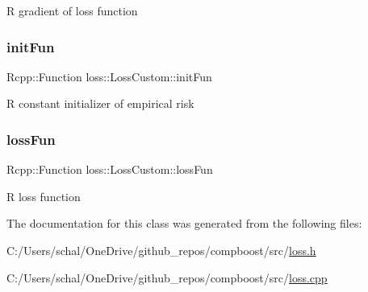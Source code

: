 {\ttfamily R} gradient of loss function 

\mbox{\label{classloss_1_1_loss_custom_aab9ba9ba105c5fa0e7e601830b6756ef}} 
\subsubsection{\texorpdfstring{init\+Fun}{initFun}}
{\footnotesize\ttfamily Rcpp\+::\+Function loss\+::\+Loss\+Custom\+::init\+Fun\hspace{0.3cm}{\ttfamily [private]}}



{\ttfamily R} constant initializer of empirical risk 

\mbox{\label{classloss_1_1_loss_custom_a5f527b03d50dc24934a9c5394f5eba54}} 
\subsubsection{\texorpdfstring{loss\+Fun}{lossFun}}
{\footnotesize\ttfamily Rcpp\+::\+Function loss\+::\+Loss\+Custom\+::loss\+Fun\hspace{0.3cm}{\ttfamily [private]}}



{\ttfamily R} loss function 



The documentation for this class was generated from the following files\+:\begin{DoxyCompactItemize}
\item 
C\+:/\+Users/schal/\+One\+Drive/github\+\_\+repos/compboost/src/\mbox{\hyperlink{loss_8h}{loss.\+h}}\item 
C\+:/\+Users/schal/\+One\+Drive/github\+\_\+repos/compboost/src/\mbox{\hyperlink{loss_8cpp}{loss.\+cpp}}\end{DoxyCompactItemize}
